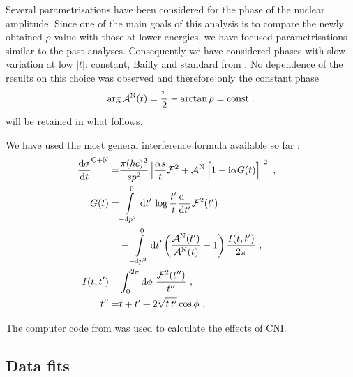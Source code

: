 Several parametrisations have been considered for the phase of the nuclear amplitude. Since one of the main goals of this analysis is to compare the newly obtained $\rho$ value with those at lower energies, we have focused parametrisations similar to the past analyses. Consequently we have considered phases with slow variation at low $|t|$: constant, Bailly and standard from \cite{totem-8tev-1km}. No dependence of the results on this choice was observed and therefore only the constant phase
\begin{equation}
\label{eq:nuc phase con}
\arg {\cal A}^{\rm N}(t) = {\pi\over 2} - \arctan\rho = \hbox{const} \ .
\end{equation}
will be retained in what follows. 

We have used the most general interference formula available so far \cite{kl94}:
\begin{equation}
\label{eq:int kl}
	\begin{aligned}
		{\d\sigma\over \d t}^{\rm C+N} =& {\pi (\hbar c)^2 \over s p^2} \left | {\alpha s\over t} {\cal F}^2
			+ {\cal A}^{\rm N}\, \Big[1 - \I\alpha G(t)\Big] \right |^2\ ,\cr
		G(t) =& \int\limits_{-4p^2}^0 \d t'\, \log {t'\over t} {\d\phantom{t'}\over \d t'} {\cal F}^2(t')\cr
			  &- \int\limits_{-4p^2}^0 \d t' \left( {{\cal A}^{\rm N}(t') \over {\cal A}^{\rm N}(t)} - 1 \right) { I(t, t')\over 2\pi }\ , \cr
		I(t, t') =& \int_0^{2\pi} \d\phi\ {{\cal F}^2(t'')\over t''}\ ,\cr
		t'' =& t + t' + 2\sqrt{t\, t'} \cos\phi\ .\cr
	\end{aligned}
\end{equation}

The computer code from \cite{elegent} was used to calculate the effects of CNI.


\subsection{Data fits}
\label{sec:rho anal}

